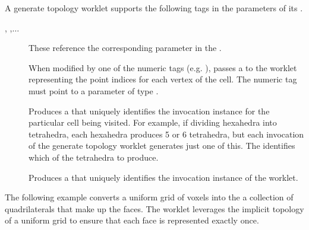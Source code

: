A generate topology worklet supports the following tags in the parameters
of its \executionsignature.
\begin{description}
\item[, ,$\ldots$] These reference the
  corresponding parameter in the \controlsignature.
\item[] When modified by one of the numeric tags
  (e.g. ), passes a  to the
  worklet representing the point indices for each vertex of the cell. The
  numeric tag must point to a \controlsignature parameter of type
  .
\item[] Produces a  that uniquely identifies the
  invocation instance for the particular cell being visited. For example,
  if dividing hexahedra into tetrahedra, each hexahedra produces 5 or 6
  tetrahedra, but each invocation of the generate topology worklet
  generates just one of this. The  identifies which of the
  tetrahedra to produce.
\item[] Produces a  that uniquely identifies the
  invocation instance of the worklet.
\end{description}

The following example converts a uniform grid of voxels into the a
collection of quadrilaterals that make up the faces. The worklet leverages
the implicit topology of a uniform grid to ensure that each face is
represented exactly once.


